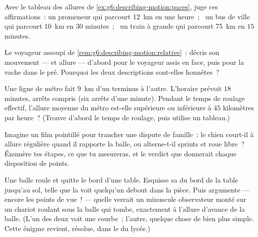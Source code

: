 \begin{exercise}[$\star$]\label{exo:g6:describing-motion:8}
Avec le tableau des allures de
\cref{ex:g6:describing-motion:paces}, juge ces affirmations~: un
promeneur qui parcourt \qty{12}{km} en une heure~; \ un bus de ville
qui parcourt \qty{10}{km} en $30$ minutes~; \ un train à grande
 qui parcourt \qty{75}{km} en $15$ minutes.
\end{exercise}

\begin{exercise}[$\star\star$]\label{exo:g6:describing-motion:9}
Le voyageur assoupi de \cref{rem:g6:describing-motion:relative}~:
décris son mouvement ---  et allure --- d'abord pour le
voyageur assis en face, puis pour la vache dans le pré. Pourquoi les
deux descriptions sont-elles honnêtes~?
\end{exercise}

\begin{exercise}[$\star\star$]\label{exo:g6:describing-motion:10}
Une ligne de métro fait \qty{9}{km} d'un terminus à l'autre. L'horaire
prévoit $18$ minutes, arrêts compris (six arrêts d'une minute).
Pendant le temps de roulage effectif, l'allure moyenne du métro
est-elle supérieure ou inférieure à $45$ kilomètres par heure~?
(Trouve d'abord le temps de roulage, puis utilise un tableau.)
\end{exercise}

\begin{exercise}[$\star\star$]\label{exo:g6:describing-motion:11}
Imagine un film pointillé pour trancher une dispute de famille~: le
chien court-il à allure régulière quand il rapporte la balle, ou
alterne-t-il sprints et roue libre~? Énumère tes étapes, ce que tu
mesureras, et le verdict que donnerait chaque disposition de points.
\end{exercise}

\begin{exercise}[$\star\star\star$]\label{exo:g6:describing-motion:12}
Une balle roule et quitte le bord d'une table. Esquisse sa
 du bord de la table jusqu'au sol, telle que la voit
quelqu'un debout dans la pièce. Puis argumente --- encore les points
de vue~! --- quelle  verrait un minuscule observateur
monté sur un chariot roulant sous la balle qui tombe, exactement à
l'allure d'avance de la balle. (L'un des deux voit une courbe~;
l'autre, quelque chose de bien plus simple. Cette énigme revient,
résolue, dans le  du lycée.)
\end{exercise}

